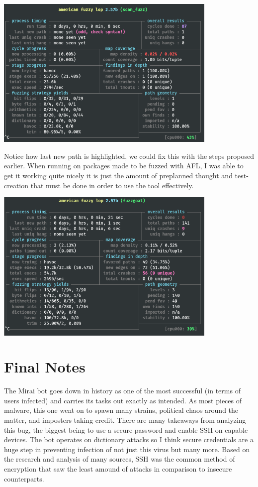 \documentclass[12pt, letterpaper]{article}
\begin{document}
\begin{sloppypar}
\begin{flushleft}
\begin{center}
{\includegraphics[width=0.8\textwidth]{afl-fuzz.png}}
\end{center}

Notice how last new path is highlighted, we could fix this with the steps proposed earlier.
When running on packages made to be fuzzed with AFL, I was able to get it working quite nicely
it is just the amount of preplanned thought and test-creation that must be done in order to 
use the tool effectively. 

\begin{center}
{\includegraphics[width=0.8\textwidth]{afl-fuzz-pass.png}}
\end{center}

\section*{Final Notes}
The Mirai bot goes down in history as one of the most successful (in terms of users infected)
and carries its tasks out exactly as intended. As most pieces of malware, this one went on 
to spawn many strains, political chaos around the matter, and imposters taking credit. There
are many takeaways from analyzing this bug, the biggest being to use a secure password and 
enable SSH on capable devices. The bot operates on dictionary attacks so I think secure 
credentials are a huge step in preventing infection of not just this virus but many more. 
Based on the research and analysis of many sources, SSH was the common method of encryption that 
saw the least amound of attacks in comparison to insecure counterparts. 

\end{flushleft}
\end{sloppypar}
\end{document}
